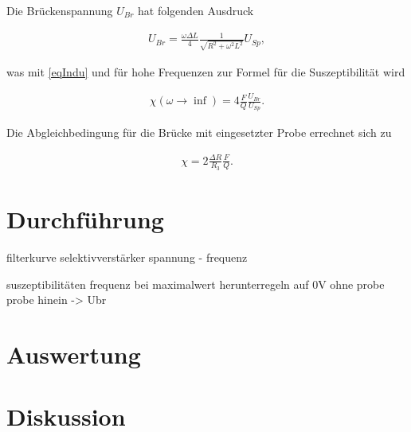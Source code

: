Die Brückenspannung $U_{Br}$ hat folgenden Ausdruck

\begin{align}
 U_{Br} = \frac{\omega \Delta L}{4} \frac{1}{\sqrt{R^2+\omega^2L^2}} U_{Sp},
\end{align}

was mit \eqref{eqIndu} und für hohe Frequenzen zur Formel für die Suszeptibilität wird

\begin{align}
 \chi(\omega \to \inf) = 4 \frac{F}{Q} \frac{U_{Br}}{U_{Sp}}.
\end{align}

Die Abgleichbedingung für die Brücke mit eingesetzter Probe errechnet sich zu 

\begin{align}
 \chi = 2 \frac{\Delta R}{R_3} \frac{F}{Q}.
\end{align}

\section{Durchführung}
filterkurve
selektivverstärker
spannung - frequenz

suszeptibilitäten
frequenz bei maximalwert
herunterregeln auf 0V ohne probe
probe hinein -> Ubr

\section{Auswertung}

\section{Diskussion}





